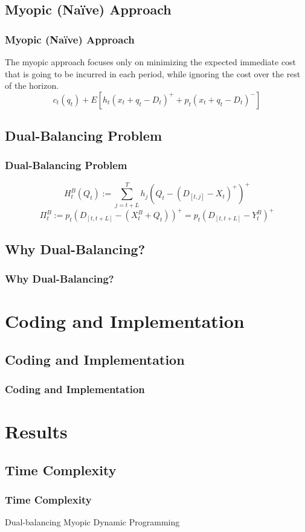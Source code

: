 \documentclass{beamer}
\begin{document}
    \subsection{Myopic (Na{\"i}ve) Approach}
    \begin{frame}
    \frametitle{Myopic (Na{\"i}ve) Approach}
      The myopic approach focuses only on minimizing the expected immediate cost that is going to be incurred in each period, while ignoring the cost over the rest of the horizon.
      \[c_{t}\left(q_{t}\right)+E\left[h_{t}\left(x_{t}+q_{t}-D_{t}\right)^{+}+p_{t}\left(x_{t}+q_{t}-D_{t}\right)^{-}\right]\]
    \end{frame}




    \subsection{Dual-Balancing Problem}
    \begin{frame}
    \frametitle{Dual-Balancing Problem}
      \[H_t^B(Q_t):=\sum\limits_{j=t+L}^T h_j(Q_t-(D_{[t,j]}-X_t)^+)^+\]
      \[\Pi_t^B:=p_t(D_{[t,t+L]}-(X_t^B+Q_t))^+=p_t(D_{[t,t+L]}-Y_t^B)^+\]
    \end{frame}

    \subsection{Why Dual-Balancing?}
    \begin{frame}
    \frametitle{Why Dual-Balancing?}

    \end{frame}
  \section{Coding and Implementation}
    \subsection{Coding and Implementation}
    \begin{frame}
    \frametitle{Coding and Implementation}

    \end{frame}
  \section{Results}
    \subsection{Time Complexity}
    \begin{frame}
    \frametitle{Time Complexity}
    Dual-balancing
    Myopic
    Dynamic Programming
    \end{frame}
\end{document}
